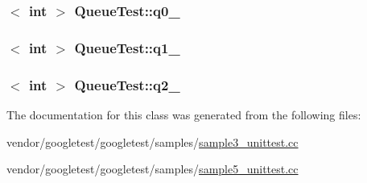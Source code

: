 \subsubsection[{\texorpdfstring{q0\+\_\+}{q0_}}]{$<$ int $>$ Queue\+Test\+::q0\+\_\+\hspace{0.3cm}{\ttfamily [protected]}}\hypertarget{classQueueTest_a0eba1fe2b31d75abd2df688ca5245e22}{}\label{classQueueTest_a0eba1fe2b31d75abd2df688ca5245e22}
\subsubsection[{\texorpdfstring{q1\+\_\+}{q1_}}]{$<$ int $>$ Queue\+Test\+::q1\+\_\+\hspace{0.3cm}{\ttfamily [protected]}}\hypertarget{classQueueTest_a1e55594e71820ba0f1b09591fb328c30}{}\label{classQueueTest_a1e55594e71820ba0f1b09591fb328c30}
\subsubsection[{\texorpdfstring{q2\+\_\+}{q2_}}]{$<$ int $>$ Queue\+Test\+::q2\+\_\+\hspace{0.3cm}{\ttfamily [protected]}}\hypertarget{classQueueTest_aeb7a2e3f6ce2d97d84eb1e01468adc2f}{}\label{classQueueTest_aeb7a2e3f6ce2d97d84eb1e01468adc2f}


The documentation for this class was generated from the following files\+:\begin{DoxyCompactItemize}
\item 
vendor/googletest/googletest/samples/\hyperlink{sample3__unittest_8cc}{sample3\+\_\+unittest.\+cc}\item 
vendor/googletest/googletest/samples/\hyperlink{sample5__unittest_8cc}{sample5\+\_\+unittest.\+cc}\end{DoxyCompactItemize}
